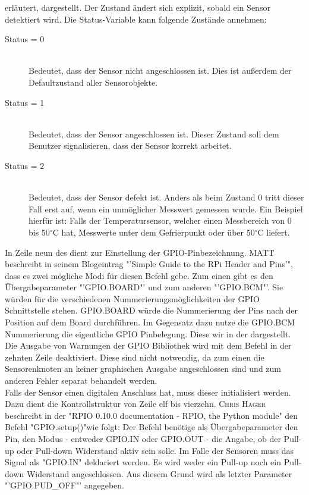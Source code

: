 	erläutert, dargestellt. Der Zustand ändert sich explizit, sobald ein Sensor detektiert wird. Die Status-Variable kann folgende Zustände annehmen:
	\begin{description}
		\item[Status = 0] \hfill \\
			Bedeutet, dass der Sensor nicht angeschlossen ist. Dies ist außerdem der Defaultzustand aller Sensorobjekte.
		\item[Status = 1] \hfill \\
			Bedeutet, dass der Sensor angeschlossen ist. Dieser Zustand soll dem Benutzer signalisieren, dass der Sensor korrekt arbeitet.
		\item[Status = 2] \hfill \\
			Bedeutet, dass der Sensor defekt ist. Anders als beim Zustand 0 tritt dieser Fall erst auf, wenn ein unmöglicher Messwert gemessen wurde. Ein Beispiel hierfür ist: Falls der Temperatursensor, welcher einen Messbereich von 0 bis 50$^\circ$C hat, Messwerte unter dem Gefrierpunkt oder über 50$^\circ$C liefert.
	\end{description}
	In Zeile neun des  dient zur Einstellung der GPIO-Pinbezeichnung. \textsc{MATT} beschreibt in seinem Blogeintrag "'Simple Guide to the RPi Header and Pins'"\cite{SimpleGu6:online}, dass es zwei mögliche Modi für diesen Befehl gebe. Zum einen gibt es den Übergabeparameter "'GPIO.BOARD"' und zum anderen "'GPIO.BCM"'. Sie würden für die verschiedenen Nummerierungsmöglichkeiten der \ac{GPIO} Schnittstelle stehen. GPIO.BOARD würde die Nummerierung der Pins nach der Position auf dem Board durchführen. Im Gegensatz dazu nutze die GPIO.BCM Nummerierung die eigentliche GPIO Pinbelegung. Diese wir in der  dargestellt.\\
	Die Ausgabe von Warnungen der GPIO Bibliothek wird mit dem Befehl in der zehnten Zeile deaktiviert. Diese sind nicht notwendig, da zum einen die Sensorenknoten an keiner graphischen Ausgabe angeschlossen sind und zum anderen Fehler separat behandelt werden.\\
	Falls der Sensor einen digitalen Anschluss hat, muss dieser initialisiert werden. Dazu dient die Kontrollstruktur von Zeile elf bis vierzehn. \textsc{Chris Hager} beschreibt in der "RPIO 0.10.0 documentation - RPIO, the Python module" den Befehl "GPIO.setup()"\space wie folgt: Der Befehl benötige als Übergabeparameter den Pin, den Modus - entweder GPIO.IN oder GPIO.OUT - die Angabe, ob der Pull-up oder Pull-down Widerstand aktiv sein solle. Im Falle der Sensoren muss das Signal als "GPIO.IN" deklariert werden. Es wird weder ein Pull-up noch ein Pull-down Widerstand angeschlossen. Aus diesem Grund wird als letzter Parameter "'GPIO.PUD\_OFF"' angegeben. \\
